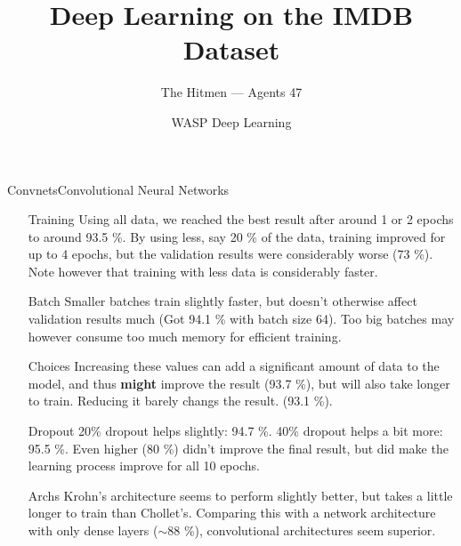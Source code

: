 \documentclass{beamer}
\title{Deep Learning on the IMDB Dataset}
\date{WASP Deep Learning}
\author[Agents 47]{The Hitmen --- Agents 47}
\begin{document}
\begin{frame}
  \titlepage
\end{frame}


\begin{frame}{Convnets}{Convolutional Neural Networks}

  \begin{itemize}

  \item[Training] Using all data, we reached the best result after around 1 or 2
    epochs to around 93.5 \%. By using less, say 20 \% of the data, training
    improved for up to 4 epochs, but the validation results were considerably
    worse (73 \%). Note however that training with less data is considerably
    faster.

  \item[Batch] Smaller batches train slightly faster, but doesn't otherwise
    affect validation results much (Got 94.1 \% with batch size 64). Too big
    batches may however consume too much memory for efficient training.

  \end{itemize}

\end{frame}

\begin{frame}
  \begin{itemize}

  \item[Choices] Increasing these values can add a significant amount of data to
    the model, and thus \textbf{might} improve the result (93.7 \%), but will
    also take longer to train. Reducing it barely changs the result. (93.1 \%).

  \item[Dropout] 20\% dropout helps slightly: 94.7 \%.  40\% dropout helps a bit
    more: 95.5 \%. Even higher (80 \%) didn't improve the final result, but did
    make the learning process improve for all 10 epochs.

  \item[Archs] Krohn's architecture seems to perform slightly better, but takes
    a little longer to train than Chollet's. Comparing this with a network
    architecture with only dense layers ($\sim88$ \%), convolutional architectures
    seem superior.

  \end{itemize}

\end{frame}
\end{document}
